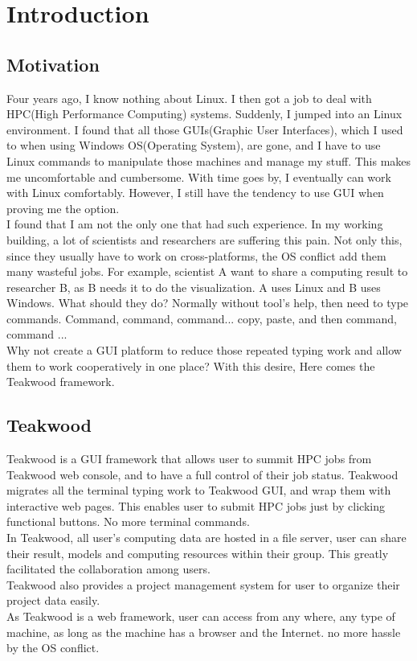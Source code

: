 \chapter{Introduction}

\section{Motivation}
Four years ago, I know nothing about Linux. I then got a job to deal with HPC(High Performance Computing) systems. Suddenly, I jumped into an Linux environment. I found that all those GUIs(Graphic User Interfaces), which I used to when using Windows OS(Operating System), are gone, and I have to use Linux commands to manipulate those machines and manage my stuff. This makes me uncomfortable and cumbersome. With time goes by, I eventually can work with Linux comfortably. However, I still have the tendency to use GUI when proving me the option.\\
I found that I am not the only one that had such experience. In my working building, a lot of scientists and researchers are suffering this pain. Not only this, since they usually have to work on cross-platforms, the OS conflict add them many wasteful jobs. For example, scientist A want to share a computing result to researcher B, as B needs it to do the visualization. A uses Linux and B uses Windows. What should they do? Normally without tool's help, then need to type commands. Command, command, command... copy, paste, and then command, command ...\\Why not create a GUI platform to reduce those repeated typing work and allow them to work cooperatively in one place? With this desire, Here comes the Teakwood framework.

\section{Teakwood}
Teakwood is a GUI framework that allows user to summit HPC jobs from Teakwood web console, and to have a full control of their job status. Teakwood migrates all the terminal typing work to Teakwood GUI, and wrap them with interactive web pages. This enables user to submit HPC jobs just by clicking functional buttons. No more terminal commands.\\
In Teakwood, all user's computing data are hosted in a file server, user can share their result, models and computing resources within their group. This greatly facilitated the collaboration among users.\\
Teakwood also provides a project management system for user to organize their project data easily. \\
As Teakwood is a web framework, user can access from any where, any type of machine, as long as the machine has a browser and the Internet. no more hassle by the OS conflict.\\

